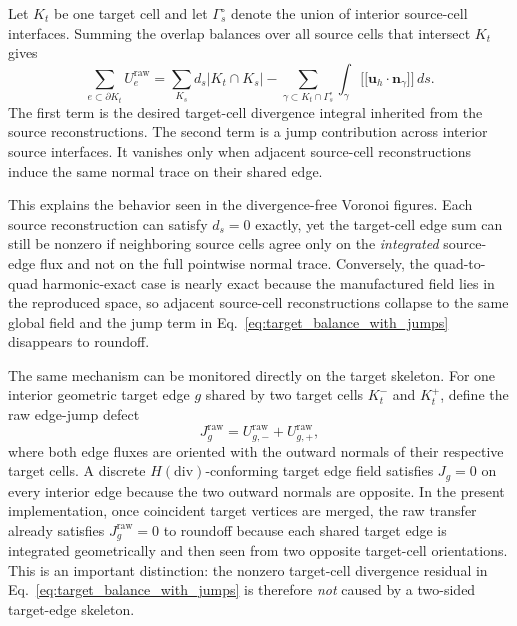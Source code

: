 \documentclass[11pt]{article}
\newcommand{\uh}{\mathbf{u}_h}
\newcommand{\n}{\mathbf{n}}
\begin{document}
Let \(K_t\) be one target cell and let \(\Gamma_s^\circ\) denote the union of
interior source-cell interfaces.  Summing the overlap balances over all source
cells that intersect \(K_t\) gives
\begin{equation}
  \sum_{e\subset \partial K_t} U^{\mathrm{raw}}_e
  =
  \sum_{K_s} d_s |K_t\cap K_s|
  -
  \sum_{\gamma \subset K_t \cap \Gamma_s^\circ}
  \int_\gamma \bigl[\!\bigl[ \uh \cdot \n_\gamma \bigr]\!\bigr] \, ds .
  \label{eq:target_balance_with_jumps}
\end{equation}
The first term is the desired target-cell divergence integral inherited from the
source reconstructions.  The second term is a jump contribution across interior
source interfaces.  It vanishes only when adjacent source-cell reconstructions
induce the same normal trace on their shared edge.

This explains the behavior seen in the divergence-free Voronoi figures.  Each
source reconstruction can satisfy \(d_s=0\) exactly, yet the target-cell edge
sum can still be nonzero if neighboring source cells agree only on the
\emph{integrated} source-edge flux and not on the full pointwise normal trace.
Conversely, the quad-to-quad harmonic-exact case is nearly exact because the
manufactured field lies in the reproduced space, so adjacent source-cell
reconstructions collapse to the same global field and the jump term in
Eq.~\eqref{eq:target_balance_with_jumps} disappears to roundoff.

The same mechanism can be monitored directly on the target skeleton.  For one
interior geometric target edge \(g\) shared by two target cells \(K_t^-\) and
\(K_t^+\), define the raw edge-jump defect
\begin{equation}
  J_g^{\mathrm{raw}}
  =
  U_{g,-}^{\mathrm{raw}} + U_{g,+}^{\mathrm{raw}},
  \label{eq:raw-edge-jump}
\end{equation}
where both edge fluxes are oriented with the outward normals of their
respective target cells.  A discrete \(H(\mathrm{div})\)-conforming target edge
field satisfies \(J_g=0\) on every interior edge because the two outward
normals are opposite.  In the present implementation, once coincident target
vertices are merged, the raw transfer already satisfies \(J_g^{\mathrm{raw}}=0\)
to roundoff because each shared target edge is integrated geometrically and then
seen from two opposite target-cell orientations.  This is an important
distinction: the nonzero target-cell divergence residual in
Eq.~\eqref{eq:target_balance_with_jumps} is therefore \emph{not} caused by a
two-sided target-edge skeleton.
\end{document}
